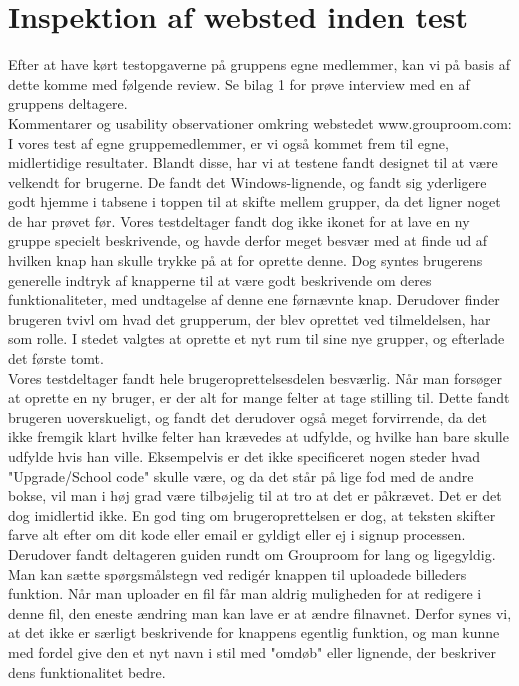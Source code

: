 \documentclass[12pt]{article}
\begin{document}
\section{Inspektion af websted inden test}
Efter at have kørt testopgaverne på gruppens egne medlemmer, kan vi på basis af dette komme med følgende review. Se bilag 1 for prøve interview med en af gruppens deltagere.\\

\noindent Kommentarer og usability observationer omkring webstedet www.grouproom.com:\\

\noindent I vores test af egne gruppemedlemmer, er vi også kommet frem til egne, midlertidige resultater. Blandt disse, har vi at testene fandt designet til at være velkendt for brugerne. De fandt det Windows-lignende, og fandt sig yderligere godt hjemme i tabsene i toppen til at skifte mellem grupper, da det ligner noget de har prøvet før. Vores testdeltager fandt dog ikke ikonet for at lave en ny gruppe specielt beskrivende, og havde derfor meget besvær med at finde ud af hvilken knap han skulle trykke på at for oprette denne. Dog syntes brugerens generelle indtryk af knapperne til at være godt beskrivende om deres funktionaliteter, med undtagelse af denne ene førnævnte knap. Derudover finder brugeren tvivl om hvad det grupperum, der blev oprettet ved tilmeldelsen, har som rolle. I stedet valgtes at oprette et nyt rum til sine nye grupper, og efterlade det første tomt.\\

\noindent Vores testdeltager fandt hele brugeroprettelsesdelen besværlig. Når man forsøger at oprette en ny bruger, er der alt for mange felter at tage stilling til. Dette fandt brugeren uoverskueligt, og fandt det derudover også meget forvirrende, da det ikke fremgik klart hvilke felter han krævedes at udfylde, og hvilke han bare skulle udfylde hvis han ville. Eksempelvis er det ikke specificeret nogen steder hvad "Upgrade/School code" skulle være, og da det står på lige fod med de andre bokse, vil man i høj grad være tilbøjelig til at tro at det er påkrævet. Det er det dog imidlertid ikke. En god ting om brugeroprettelsen er dog, at teksten skifter farve alt efter om dit kode eller email er gyldigt eller ej i signup processen. Derudover fandt deltageren guiden rundt om Grouproom for lang og ligegyldig.\\

\noindent Man kan sætte spørgsmålstegn ved redigér knappen til uploadede billeders funktion. Når man uploader en fil får man aldrig muligheden for at redigere i denne fil, den eneste ændring man kan lave er at ændre filnavnet. Derfor synes vi, at det ikke er særligt beskrivende for knappens egentlig funktion, og man kunne med fordel give den et nyt navn i stil med "omdøb" eller lignende, der beskriver dens funktionalitet bedre.\\
\end{document}
